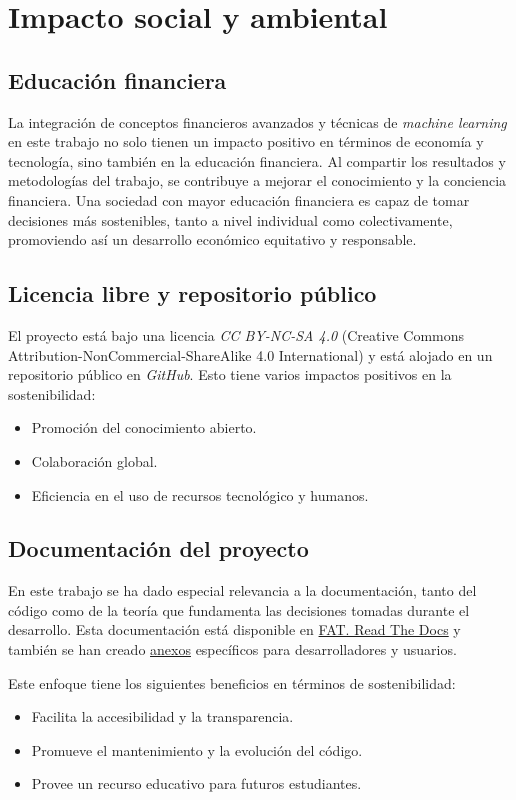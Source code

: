\section{Impacto social y ambiental}

\subsection{Educación financiera}

La integración de conceptos financieros avanzados y técnicas de \emph{machine learning} en este trabajo no solo tienen un impacto positivo en términos de economía y tecnología, sino también en la educación financiera. Al compartir los resultados y metodologías del trabajo, se contribuye a mejorar el conocimiento y la conciencia financiera. Una sociedad con mayor educación financiera es capaz de tomar decisiones más sostenibles, tanto a nivel individual como colectivamente, promoviendo así un desarrollo económico equitativo y responsable.

\subsection{Licencia libre y repositorio público}

El proyecto está bajo una licencia \emph{CC BY-NC-SA 4.0} (Creative Commons Attribution-NonCommercial-ShareAlike 4.0 International) y está alojado en un repositorio público en \emph{GitHub}. Esto tiene varios impactos positivos en la sostenibilidad:

\begin{itemize}
\item
Promoción del conocimiento abierto.
\item
Colaboración global.
\item
Eficiencia en el uso de recursos tecnológico y humanos.
\end{itemize}

\subsection{Documentación del proyecto}

En este trabajo se ha dado especial relevancia a la documentación, tanto del código como de la teoría que fundamenta las decisiones tomadas durante el desarrollo. Esta documentación está disponible en \href{https://fat.readthedocs.io/es/latest/intro.html}{FAT. Read The Docs} y también se han creado \href{https://github.com/rmt0009alu/FAT/blob/main/docs/latex/anexos.pdf}{anexos} específicos para desarrolladores y usuarios. 

Este enfoque tiene los siguientes beneficios en términos de sostenibilidad:

\begin{itemize}
\item
Facilita la accesibilidad y la transparencia.
\item
Promueve el mantenimiento y la evolución del código. 
\item
Provee un recurso educativo para futuros estudiantes. 
\end{itemize}
